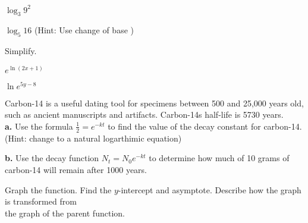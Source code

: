 \documentclass{report}
\theoremstyle{definition}
\begin{document}
\begin{enumerate}
	\begin{minipage}[t]{0.45\linewidth}
		\item $\log_3 9^2$
	\end{minipage}
	\hfill
	\begin{minipage}[t]{0.45\linewidth}
		\item $\log_5 16$ (Hint: Use change of base )
	\end{minipage}




\vfill

 \newpage

\hspace{-2cm} Simplify.



	\begin{minipage}[t]{0.45\linewidth}
		\item $e^{\ln(2x+1)}$
	\end{minipage}
	\hfill
	\begin{minipage}[t]{0.45\linewidth}
		\item $\ln e^{5y-8}$
	\end{minipage}
	
	\vspace{2cm}
	
	
	\begin{minipage}[t]{0.95\linewidth}
		\item Carbon-14 is a useful dating tool for specimens between 500 and 25,000 years old, such as ancient manuscripts and artifacts. Carbon-14s half-life is 5730 years.\\
		
		\textbf{a.} Use the formula $\frac{1}{2}=e^{-kt}$ to find the value of the decay constant for carbon-14.\\ (Hint: change to a natural logarthimic equation)\\
		\vspace{1cm}

		\textbf{b.} Use the decay function $N_t=N_0e^{-kt}$ to determine how much of 10 grams of carbon-14 will remain after 1000 years.\\

	\end{minipage}
	
	\vspace{2cm}
	\hspace{-2cm }Graph the function. Find the $y$-intercept and asymptote. Describe how the graph is transformed from\\
	\vspace{-0.5cm}
	\hspace{-2.25cm } the graph of the parent function.\\
	

\end{enumerate}
\end{document}

